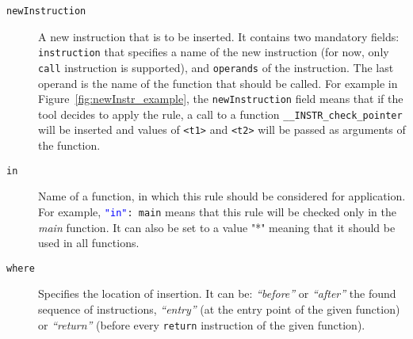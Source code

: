 \begin{description}
        \begin{minipage}{\linewidth}
        
        \label{fig:findInstrs_example}
      \end{minipage}

    \item[\texttt{newInstruction}] A new instruction that is to be inserted. It
    contains two mandatory fields: \texttt{instruction} that specifies a name
    of the new instruction (for now, only \texttt{call} instruction is
    supported), and \texttt{operands} of the instruction. The last operand is
    the name of the function that should be called. For example in
    Figure~\ref{fig:newInstr_example}, the \texttt{newInstruction} field means
    that if the tool decides to apply the rule, a call to a function
    \texttt{\_\_INSTR\_check\_pointer} will be inserted and values of
    \texttt{<t1>} and \texttt{<t2>} will be passed as arguments of the
    function.

     \begin{minipage}{\linewidth}
        
        \label{fig:newInstr_example}
      \end{minipage}

    \item[\texttt{in}] Name of a function, in which this rule should be
    considered for application. For example, \texttt{\textcolor{blue}{"in"}:
    main} means that this rule will be checked only in the \emph{main}
    function. It can also be set to a value "*" meaning that it should be used
    in all functions.

    \item[\texttt{where}] Specifies the location of insertion. It can be:
    \emph{``before''} or \emph{``after''} the found sequence of instructions,
    \emph{``entry''} (at the entry point of the given function) or \emph{``return''}
    (before every \texttt{return} instruction of the given function).


\end{description}
